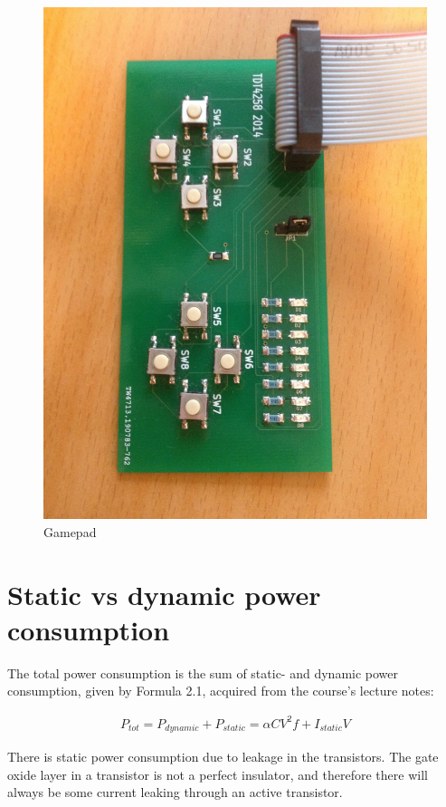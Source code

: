 \begin{figure}
\centering
\includegraphics[scale=0.1]{images/gamepad.jpg}
\caption{Gamepad}
\label{fig:gamepad}
\end{figure}


\section{Static vs dynamic power consumption}
\label{sec:static}
The total power consumption is the sum of static- and dynamic power consumption, given by Formula 2.1, acquired from the course's lecture notes:

\begin{gather}
\label{cycle-formula}
P_{tot} = P_{dynamic} + P_{static} = \alpha C V^{2} f + I_{static} V
\end{gather}

There is static power consumption due to leakage in the transistors. The gate oxide layer in a transistor is not a perfect insulator, and therefore there will always be some current leaking through an active transistor. 

